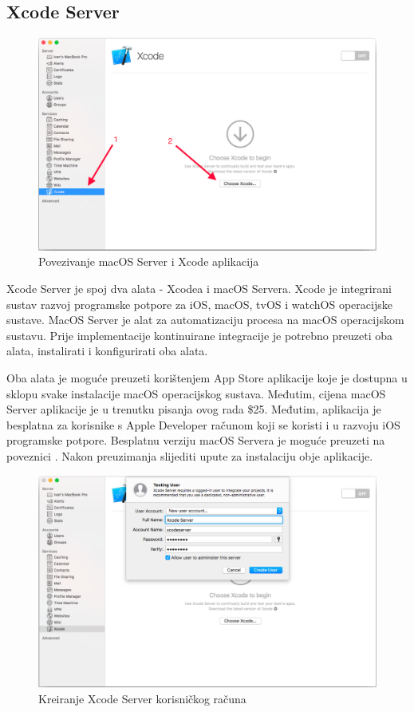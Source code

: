 \documentclass[times, utf8, diplomski, numeric]{fer}
\begin{document}
\subsection{Xcode Server}

\begin{figure}
\centering
\includegraphics[scale=0.35]{XcodeServerSetup1}
\caption{Povezivanje macOS Server i Xcode aplikacija}
\label{fig:XcodeServerSetup1}
\end{figure}

Xcode Server je spoj dva alata - Xcodea i macOS Servera. Xcode je integrirani sustav razvoj programske potpore za iOS, macOS, tvOS i watchOS operacijske sustave. MacOS Server je alat za automatizaciju procesa na macOS operacijskom sustavu. Prije implementacije kontinuirane integracije je potrebno preuzeti oba alata, instalirati i konfigurirati oba alata.

Oba alata je moguće preuzeti korištenjem App Store aplikacije koje je dostupna u sklopu svake instalacije macOS operacijskog sustava. Međutim, cijena macOS Server aplikacije je u trenutku pisanja ovog rada \$25. Međutim, aplikacija je besplatna za korisnike s Apple Developer računom koji se koristi i u razvoju iOS programske potpore. Besplatnu verziju macOS Servera je moguće preuzeti na poveznici . Nakon preuzimanja slijediti upute za instalaciju obje aplikacije.

\begin{figure}
\centering
\includegraphics[scale=0.35]{XcodeServerSetup2}
\caption{Kreiranje Xcode Server korisničkog računa}
\label{fig:XcodeServerSetup2}
\end{figure}
\end{document}
